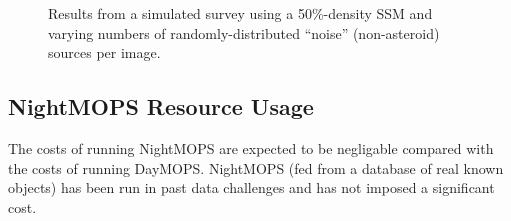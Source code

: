 \documentclass[12pt,preprint]{aastex}
\begin{document}
\begin{figure}

\caption{Results from a simulated survey using a 50\%-density SSM and
  varying numbers of randomly-distributed ``noise'' (non-asteroid)
  sources per image.}
\label{noiseDensity}
\end{figure}






\subsection{NightMOPS Resource Usage}

The costs of running NightMOPS are expected to be negligable compared
with the costs of running DayMOPS.  NightMOPS (fed from a database of
real known objects) has been run in past data challenges and has not
imposed a significant cost. 
\end{document}
